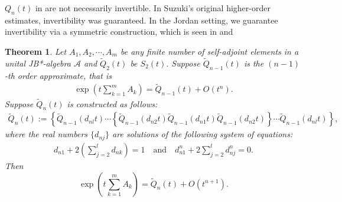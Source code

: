 \documentclass{article}
\theoremstyle{plain} %
\newtheorem{thm}{Theorem}[section]
\numberwithin{equation}{section}
\newcommand{\zw}[1]{{\color{UGARed}{#1\textsuperscript{ZW}}}}
\begin{document}
\iffalse 
$Q_n(t)$ in 
are not necessarily invertible. In Suzuki's original higher-order estimates, invertibility was guaranteed. In the Jordan setting, we guarantee invertibility via a symmetric construction, which is seen in  and  \zw{rewrite this}

\begin{thm}\label{thm:Trotter:higher:symmetric:JB*}
Let $A_1, A_2,\cdots, A_m$ be any finite number of self-adjoint elements in a unital JB*-algebra $\mathcal{A}$ and $\widetilde{Q}_{2}(t)$ be $S_2(t).$ Suppose $\widetilde{Q}_{n-1}(t)$ is the $(n-1)$-th order approximate, that is 
    \begin{align}
       \exp\left(t\sum_{k=1}^m A_k\right)=\widetilde{Q}_{n-1}(t)+O(t^n). 
    \end{align}
Suppose $\widetilde{Q}_n(t)$ is constructed as follows:
\begin{align}
 \widetilde{Q}_n(t):=\left\{\widetilde{Q}_{n-1}\left(d_{nl} t\right)\cdots\left\{\widetilde{Q}_{n-1}\left(d_{n2} t\right)\widetilde{Q}_{n-1}(d_{n1} t)\widetilde{Q}_{n-1}\left(d_{n2} t\right)\right\}\cdots \widetilde{Q}_{n-1}\left(d_{nl}t\right)\right\},   
\end{align}
where the real numbers $\{d_{nj}\}$ are solutions of the following system of equations:
\begin{align}\label{eqt:norder:symmetric}
d_{n1}+2\left(\sum_{j=2}^l d_{nk}\right)=1\quad\mbox{and}\quad d_{n1}^n+2\sum_{j=2}^l d_{nj}^n=0.
\end{align}
Then 
\begin{equation}
     \exp\left(t\sum_{k=1}^m A_k\right)=\widetilde{Q}_{n}(t)+O(t^{n+1}). 
\end{equation}
\end{thm}
\end{document}
